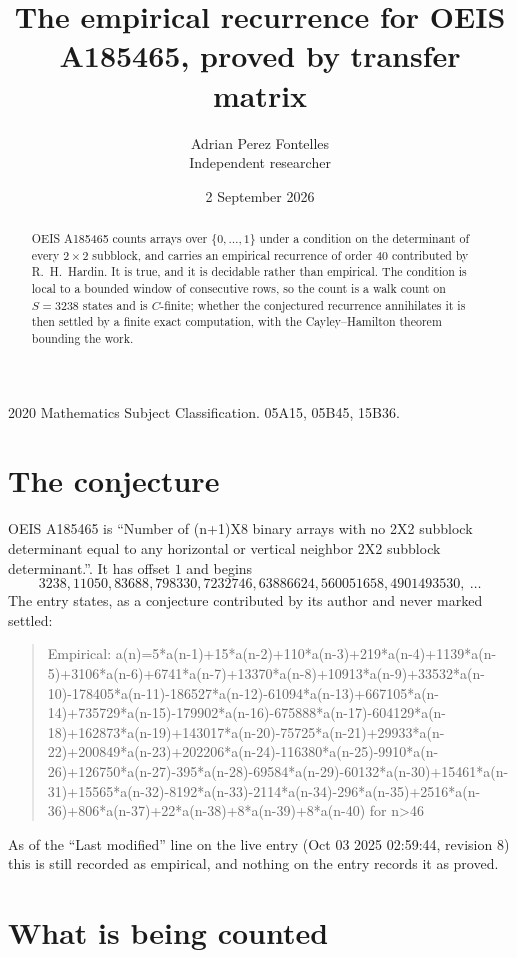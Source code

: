 \documentclass[11pt,a4paper]{article}
\title{The empirical recurrence for OEIS A185465, proved by transfer matrix}
\author{Adrian Perez Fontelles\\ \small Independent researcher}
\date{2 September 2026}
\theoremstyle{plain}
\theoremstyle{definition}
\begin{document}
\maketitle

\begin{abstract}
OEIS A185465 counts arrays over $\{0,\dots,1\}$ under a condition on the determinant of every
$2\times2$ subblock, and carries an empirical recurrence of order $40$ contributed by
R.~H.~Hardin. It is true, and it is decidable rather than empirical. The condition is local to
a bounded window of consecutive rows, so the count is a walk count on $S=3238$ states and is
$C$-finite; whether the conjectured recurrence annihilates it is then settled by a finite exact
computation, with the Cayley--Hamilton theorem bounding the work.
\end{abstract}

\noindent\small 2020 Mathematics Subject Classification. 05A15, 05B45, 15B36.\normalsize

\section{The conjecture}

OEIS A185465 is ``Number of (n+1)X8 binary arrays with no 2X2 subblock determinant equal to any horizontal or vertical neighbor 2X2 subblock determinant.''. It has offset $1$ and begins
\[
3238, 11050, 83688, 798330, 7232746, 63886624, 560051658, 4901493530,\ \dots
\]
The entry states, as a conjecture contributed by its author and never marked settled:
\begin{quote}
Empirical: a(n)=5*a(n-1)+15*a(n-2)+110*a(n-3)+219*a(n-4)+1139*a(n-5)+3106*a(n-6)+6741*a(n-7)+13370*a(n-8)+10913*a(n-9)+33532*a(n-10)-178405*a(n-11)-186527*a(n-12)-61094*a(n-13)+667105*a(n-14)+735729*a(n-15)-179902*a(n-16)-675888*a(n-17)-604129*a(n-18)+162873*a(n-19)+143017*a(n-20)-75725*a(n-21)+29933*a(n-22)+200849*a(n-23)+202206*a(n-24)-116380*a(n-25)-9910*a(n-26)+126750*a(n-27)-395*a(n-28)-69584*a(n-29)-60132*a(n-30)+15461*a(n-31)+15565*a(n-32)-8192*a(n-33)-2114*a(n-34)-296*a(n-35)+2516*a(n-36)+806*a(n-37)+22*a(n-38)+8*a(n-39)+8*a(n-40) for n>46
\end{quote}
As of the ``Last modified'' line on the live entry (Oct 03 2025 02:59:44, revision 8) this is still
recorded as empirical, and nothing on the entry records it as proved.

\section{What is being counted}
\end{document}
